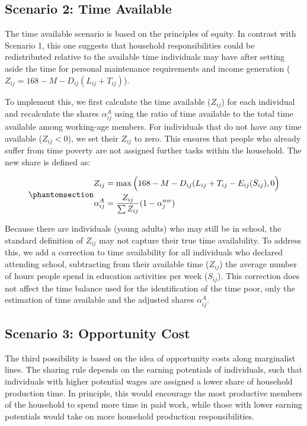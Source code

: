 \documentclass[
  11pt,
]{article}
\begin{document}
\subsection{Scenario 2: Time Available}\label{scenario-2-time-available}

The time available scenario is based on the principles of equity. In
contrast with Scenario 1, this one suggests that household
responsibilities could be redistributed relative to the available time
individuals may have after setting aside the time for personal
maintenance requirements and income generation
(\(Z_{ij}=168-M-D_{ij}(L_{ij}+T_{ij})\)).

To implement this, we first calculate the time available (\(Z_{ij}\))
for each individual and recalculate the shares \(\alpha_{ij}^A\) using
the ratio of time available to the total time available among
working-age members. For individuals that do not have any time available
(\(Z_{ij}<0\)), we set their \(Z_{ij}\) to zero. This ensures that
people who already suffer from time poverty are not assigned further
tasks within the household. The new share is defined as:

\begin{equation}\phantomsection\label{eq-r2}{
\begin{aligned}
Z_{ij} &=\max{\Big(168-M-D_{ij}(L_{ij}+T_{ij}-E_{ij}(S_{ij}),0\Big)} \\
\alpha_{ij}^A &= \frac{Z_{ij}}{\sum Z_{ij}} (1-\alpha_{j}^{nw})
\end{aligned}
}\end{equation}

Because there are individuals (young adults) who may still be in school,
the standard definition of \(Z_{ij}\) may not capture their true time
availability. To address this, we add a correction to time availability
for all individuals who declared attending school, subtracting from
their available time (\(Z_{ij}\)) the average number of hours people
spend in education activities per week (\(S_{ij}\)). This correction
does not affect the time balance used for the identification of the time
poor, only the estimation of time available and the adjusted shares
\(\alpha_{ij}^A\).

\subsection{Scenario 3: Opportunity
Cost}\label{scenario-3-opportunity-cost}

The third possibility is based on the idea of opportunity costs along
marginalist lines. The sharing rule depends on the earning potentials of
individuals, such that individuals with higher potential wages are
assigned a lower share of household production time. In principle, this
would encourage the most productive members of the household to spend
more time in paid work, while those with lower earning potentials would
take on more household production responsibilities.
\end{document}

